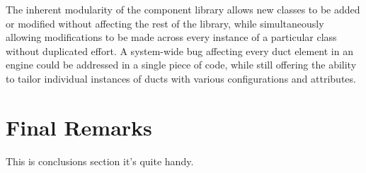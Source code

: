 \documentclass[heading.tex]{subfiles}
\begin{document}
	The inherent modularity of the component library allows new classes to be added or modified
without affecting the rest of the library, while simultaneously allowing modifications to be made
across every instance of a particular class without duplicated effort. A system-wide bug affecting
every duct element in an engine could be addressed in a single piece of code, while still offering
the ability to tailor individual instances of ducts with various configurations and attributes.

\section{Final Remarks}
This is conclusions section it's quite handy.
\end{document}
